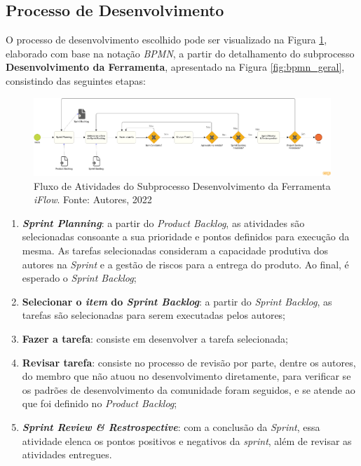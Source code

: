 \subsection{Processo de Desenvolvimento}

\label{sec:met_dev}

O processo de desenvolvimento escolhido pode ser visualizado na Figura \ref{fig:bpmn_dev}, elaborado com base na notação \textit{BPMN},  a partir do detalhamento do subprocesso \textbf{Desenvolvimento da Ferramenta}, apresentado na Figura \ref{fig:bpmn_geral}, consistindo das seguintes etapas:

\begin{figure}[H]
    \begin{center}
        \includegraphics[scale=0.23]{figuras/Metodologia/bpmn_dev.png}
        \caption{{Fluxo de Atividades do Subprocesso Desenvolvimento da Ferramenta \textit{iFlow}. Fonte: Autores, 2022}}
        \label{fig:bpmn_dev}
    \end{center}
\end{figure}

\begin{enumerate}
    \item \textbf{\textit{Sprint Planning}}: a partir do \textit{Product Backlog}, as atividades são selecionadas consoante a sua prioridade e pontos definidos para execução da mesma. As tarefas selecionadas consideram a capacidade produtiva dos autores na \textit{Sprint} e a gestão de riscos para a entrega do produto. Ao final, é esperado o \textit{Sprint Backlog};
    \item \textbf{Selecionar o \textit{item} do \textit{Sprint Backlog}}: a partir do \textit{Sprint Backlog}, as tarefas são selecionadas para serem executadas pelos autores;
    \item \textbf{Fazer a tarefa}: consiste em desenvolver a tarefa selecionada;
    \item \textbf{Revisar tarefa}: consiste no processo de revisão por parte, dentre os autores, do membro que não atuou no desenvolvimento diretamente, para verificar se os padrões de desenvolvimento da comunidade foram seguidos, e se atende ao que foi definido no \textit{Product Backlog};
    \item \textbf{\textit{Sprint Review \& Restrospective}}: com a conclusão da \textit{Sprint}, essa atividade elenca os pontos positivos e negativos da \textit{sprint}, além de revisar as atividades entregues.
\end{enumerate}


